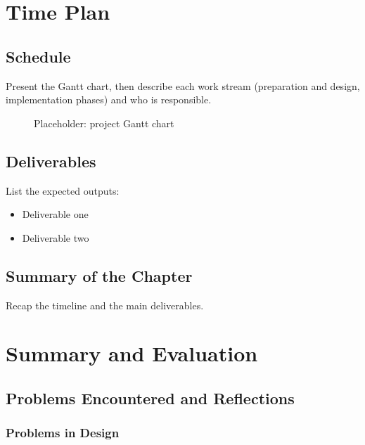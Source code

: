\documentclass[
  12pt,
  a4paper,
]{report}
\providecommand{\tightlist}{%
  \setlength{\itemsep}{0pt}\setlength{\parskip}{0pt}}
\begin{document}
\chapter{Time Plan}\label{time-plan}

\section{Schedule}\label{schedule}

Present the Gantt chart, then describe each work stream (preparation and
design, implementation phases) and who is responsible.

\begin{figure}
\centering
{}
\caption{Placeholder: project Gantt chart}
\end{figure}

\section{Deliverables}\label{deliverables}

List the expected outputs:

\begin{itemize}
\tightlist
\item
  Deliverable one
\item
  Deliverable two
\end{itemize}

\section{Summary of the Chapter}\label{summary-of-the-chapter-4}

Recap the timeline and the main deliverables.

\chapter{Summary and Evaluation}\label{summary-and-evaluation}

\section{Problems Encountered and
Reflections}\label{problems-encountered-and-reflections}

\subsection{Problems in Design}\label{problems-in-design}
\end{document}
